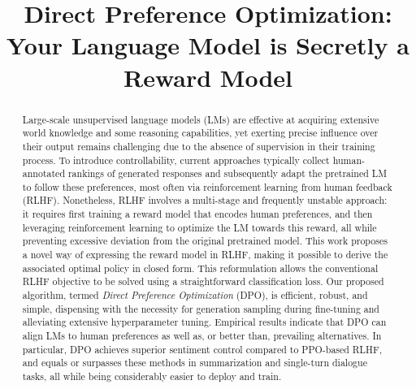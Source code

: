 \title{Direct Preference Optimization: Your Language Model is Secretly a Reward Model}

\begin{abstract}
Large-scale unsupervised language models (LMs) are effective at acquiring extensive world knowledge and some reasoning capabilities, yet exerting precise influence over their output remains challenging due to the absence of supervision in their training process. To introduce controllability, current approaches typically collect human-annotated rankings of generated responses and subsequently adapt the pretrained LM to follow these preferences, most often via reinforcement learning from human feedback (RLHF). Nonetheless, RLHF involves a multi-stage and frequently unstable approach: it requires first training a reward model that encodes human preferences, and then leveraging reinforcement learning to optimize the LM towards this reward, all while preventing excessive deviation from the original pretrained model. This work proposes a novel way of expressing the reward model in RLHF, making it possible to derive the associated optimal policy in closed form. This reformulation allows the conventional RLHF objective to be solved using a straightforward classification loss. Our proposed algorithm, termed \textit{Direct Preference Optimization} (DPO), is efficient, robust, and simple, dispensing with the necessity for generation sampling during fine-tuning and alleviating extensive hyperparameter tuning. Empirical results indicate that DPO can align LMs to human preferences as well as, or better than, prevailing alternatives. In particular, DPO achieves superior sentiment control compared to PPO-based RLHF, and equals or surpasses these methods in summarization and single-turn dialogue tasks, all while being considerably easier to deploy and train.
\end{abstract}

